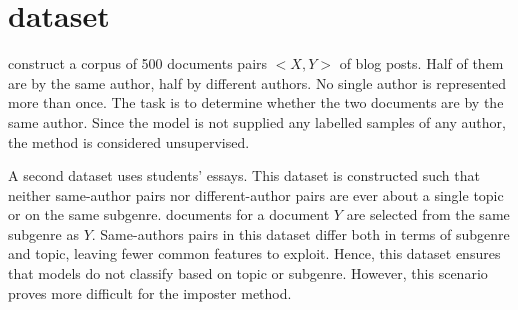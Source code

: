 \section{\imp{} dataset}
\label{sec:impostor_dataset}

\citet{koppel_determining_2014} construct a corpus of 500 documents pairs $<X,Y>$ of blog posts.
Half of them are by the same author, half by different authors.
No single author is represented more than once.
The task is to determine whether the two documents are by the same author.
Since the model is not supplied any labelled samples of any author, the method is considered unsupervised.

A second dataset uses students' essays.
This dataset is constructed such that neither same-author pairs nor different-author pairs 
are ever about a single topic or on the same subgenre.
\imp{} documents for a document $Y$ are selected from the same subgenre as $Y$.
Same-authors pairs in this dataset differ both in terms of subgenre and topic, leaving fewer common features to exploit.
Hence, this dataset ensures that models do not classify based on topic or subgenre.
However, this scenario proves more difficult for the imposter method.